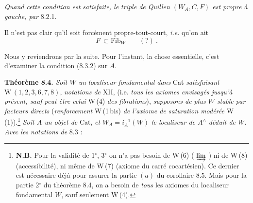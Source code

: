 \documentclass[11pt]{article}
\newcommand{\printedpage}[1]{\marginpar{\footnotesize p.~#1}}
\newcommand{\msp}[1]{\marginpar{\footnotesize [#1]}}
\newcommand{\Fib}{\mathrm{Fib}}
\newcommand{\chap}{^{\wedge}}
\begin{document}
\textit{Quand cette condition est satisfaite, le triple de Quillen $(W_A,C,F)$ est propre à gauche, par} 8.2.1.

Il n'est pas clair qu'il soit forcément propre-tout-court, \textit{i.e.} qu'on ait
\[
F\ \subset \Fib_W \qquad (?)\ .
\tag*{(8.3.3)}
\]

Nous y reviendrons par la suite. Pour l'instant, la chose essentielle, c'est d'examiner la condition (8.3.2) sur $A$.

\printedpage{58}
\msp{page 105}
\textbf{Théorème 8.4.} \textit{Soit $W$ un localiseur fondamental dans} Cat \textit{satisfaisant} $\mathrm{W}\,(1,2,3,6,7,8)$, \textit{notations de} XII, (i.e. \textit{tous les axiomes envisagés jusqu'à présent, sauf peut-être celui} W\,(4) \textit{des fibrations}), \textit{supposons de plus $W$ stable par facteurs directs} (\textit{renforcement} W\,(1\,bis) \textit{de l'axiome de saturation modérée} W\,(1)).\footnote[37]{\textbf{N.B.} Pour la validité de 1$^\circ$, 3$^\circ$ on n'a pas besoin de W\,(6) ( $\varinjlim$ ) ni de W\,(8) (accessibilité), ni même de W\,(7) (axiome du carré cocartésien). Ce dernier est nécessaire déjà pour assurer la partie $(a)$ du corollaire 8.5. Mais pour la partie 2$^\circ$ du théorème 8.4, on a besoin de \textit{tous} les axiomes du localiseur fondamental $W$, sauf seulement W\,(4).} \textit{Soit $A$ un objet de} Cat, \textit{et $W_A=i_A^{-1}(W)$ le localiseur de $A\chap$ déduit de $W$. Avec les notations de} 8.3 :
\end{document}
